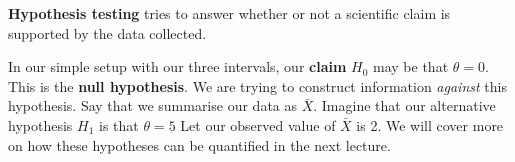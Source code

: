 \documentclass[titlepage, 12pt, leqno]{article}
\begin{document}
\begin{definition}
    \textbf{Hypothesis testing} tries to answer whether or not a scientific
    claim is supported by the data collected.
\end{definition}

In our simple setup with our three intervals, our \textbf{claim} $H_{0}$
may be that $\theta = 0$. This is the \textbf{null hypothesis}. We are trying 
to construct information \textit{against} this hypothesis. Say that we summarise
our data as $\bar X$. Imagine that our alternative hypothesis $H_{1}$ is that
$\theta = 5$ Let our observed value of $\bar X$ is 2. We will cover more on
how these hypotheses can be quantified in the next lecture.
\end{document}
